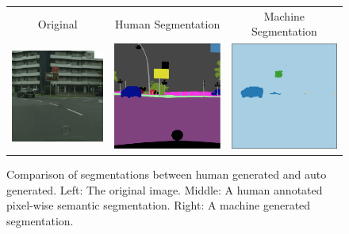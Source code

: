 \documentclass[10pt,twocolumn,letterpaper]{article}
\begin{document}
\begin{figure}[t!]
    \begin{center}
        \begin{tabular}{ccc}
            Original & Human Segmentation & Machine Segmentation \\
            \includegraphics[trim=0 0 0 0, clip,
                width=2.0in]{images/segmentation_original.png} &
            \includegraphics[trim=0 0 0 0, clip,
                width=2.0in]{images/segmentation_human.png} &
            \includegraphics[trim=0 0 0 0, clip,
                width=2.0in]{images/segmentation_machine.png} \\
        \end{tabular}
    \end{center}
    \caption{Comparison of segmentations between human generated
    and auto generated. Left: The original image. Middle: A human
    annotated pixel-wise semantic segmentation. Right: A machine
    generated segmentation.}
    \label{fig:segmentations}
\end{figure}
\end{document}
